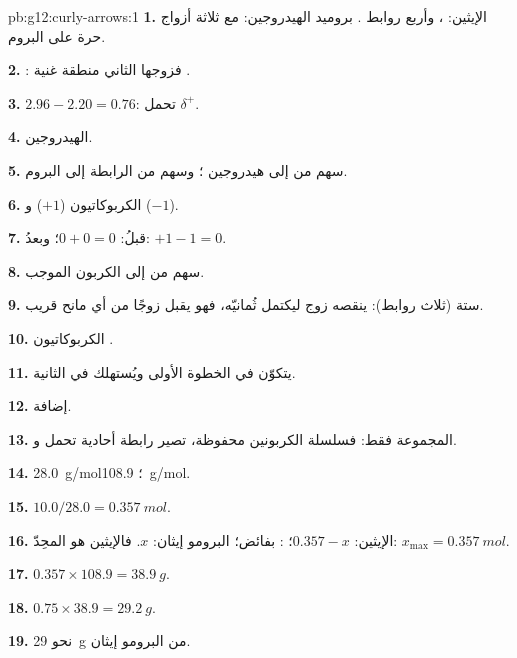\begin{solution}{pb:g12:curly-arrows:1}
\textbf{1.} الإيثين: ،  وأربع روابط .
بروميد الهيدروجين:  مع ثلاثة أزواج حرة على البروم.

\textbf{2.} : فزوجها الثاني منطقة غنية
.

\textbf{3.} $2.96 - 2.20 = 0.76$:   تحمل $\delta^+$.

\textbf{4.}  الهيدروجين.

\textbf{5.} سهم من  إلى هيدروجين ؛
وسهم من الرابطة  إلى البروم.

\textbf{6.} الكربوكاتيون  ($+1$) و ($-1$).

\textbf{7.} قبلُ: $0 + 0 = 0$؛ وبعدُ: $+1 - 1 = 0$.

\textbf{8.} سهم من    إلى الكربون
الموجب.

\textbf{9.} ستة (ثلاث روابط): ينقصه زوج ليكتمل ثُمانيّه، فهو يقبل
زوجًا من أي مانح قريب.

\textbf{10.} الكربوكاتيون .

\textbf{11.} يتكوّن في الخطوة الأولى ويُستهلك في الثانية.

\textbf{12.} إضافة.

\textbf{13.} المجموعة فقط: فسلسلة الكربونين محفوظة،
 تصير رابطة أحادية تحمل  و.

\textbf{14.} \qty{28.0}{g/mol}؛ \qty{108.9}{g/mol}.

\textbf{15.} $10.0 / 28.0 = \qty{0.357}{mol}$.

\textbf{16.} الإيثين: $0.357 - x$؛ : بفائض؛ البرومو إيثان: $x$.
فالإيثين هو المحِدّ: $x_{\max} = \qty{0.357}{mol}$.

\textbf{17.} $0.357 \times 108.9 = \qty{38.9}{g}$.

\textbf{18.} $0.75 \times 38.9 = \qty{29.2}{g}$.

\textbf{19.} نحو \qty{29}{g} من البرومو إيثان.
\end{solution}
